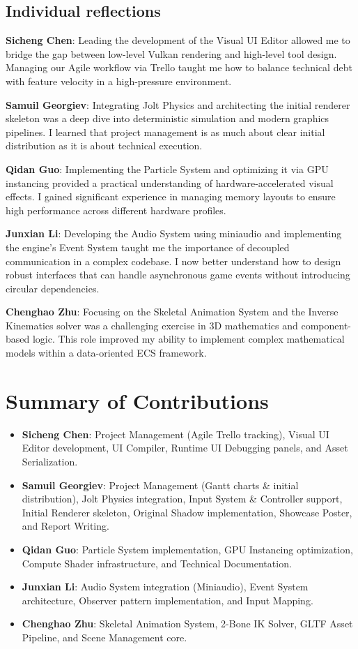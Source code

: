 \documentclass[acmtog, nonacm]{acmart}
\begin{document}
\subsection{Individual reflections}
\textbf{Sicheng Chen}: Leading the development of the Visual UI Editor allowed me to bridge the gap between low-level Vulkan rendering and high-level tool design. Managing our Agile workflow via Trello taught me how to balance technical debt with feature velocity in a high-pressure environment.

\textbf{Samuil Georgiev}: Integrating Jolt Physics and architecting the initial renderer skeleton was a deep dive into deterministic simulation and modern graphics pipelines. I learned that project management is as much about clear initial distribution as it is about technical execution.

\textbf{Qidan Guo}: Implementing the Particle System and optimizing it via GPU instancing provided a practical understanding of hardware-accelerated visual effects. I gained significant experience in managing memory layouts to ensure high performance across different hardware profiles.

\textbf{Junxian Li}: Developing the Audio System using miniaudio and implementing the engine's Event System taught me the importance of decoupled communication in a complex codebase. I now better understand how to design robust interfaces that can handle asynchronous game events without introducing circular dependencies.

\textbf{Chenghao Zhu}: Focusing on the Skeletal Animation System and the Inverse Kinematics solver was a challenging exercise in 3D mathematics and component-based logic. This role improved my ability to implement complex mathematical models within a data-oriented ECS framework.

\section{Summary of Contributions}
\begin{itemize}
    \item \textbf{Sicheng Chen}: Project Management (Agile Trello tracking), Visual UI Editor development, UI Compiler, Runtime UI Debugging panels, and Asset Serialization.
    \item \textbf{Samuil Georgiev}: Project Management (Gantt charts \& initial distribution), Jolt Physics integration, Input System \& Controller support, Initial Renderer skeleton, Original Shadow implementation, Showcase Poster, and Report Writing.
    \item \textbf{Qidan Guo}: Particle System implementation, GPU Instancing optimization, Compute Shader infrastructure, and Technical Documentation.
    \item \textbf{Junxian Li}: Audio System integration (Miniaudio), Event System architecture, Observer pattern implementation, and Input Mapping.
    \item \textbf{Chenghao Zhu}: Skeletal Animation System, 2-Bone IK Solver, GLTF Asset Pipeline, and Scene Management core.
\end{itemize}
\end{document}
